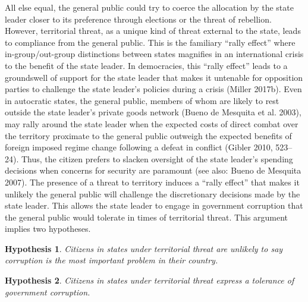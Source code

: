 \documentclass[11pt,]{article}
\newtheorem{hypothesis}{Hypothesis}
\begin{document}
All else equal, the general public could try to coerce the allocation by
the state leader closer to its preference through elections or the
threat of rebellion. However, territorial threat, as a unique kind of
threat external to the state, leads to compliance from the general
public. This is the familiary ``rally effect'' where in-group/out-group
distinctions between states magnifies in an international crisis to the
benefit of the state leader. In democracies, this ``rally effect'' leads
to a groundswell of support for the state leader that makes it untenable
for opposition parties to challenge the state leader's policies during a
crisis (Miller 2017b). Even in autocratic states, the general public,
members of whom are likely to rest outside the state leader's private
goods network (Bueno de Mesquita et al. 2003), may rally around the
state leader when the expected costs of direct combat over the territory
proximate to the general public outweigh the expected benefits of
foreign imposed regime change following a defeat in conflict (Gibler
2010, 523--24). Thus, the citizen prefers to slacken oversight of the
state leader's spending decisions when concerns for security are
paramount (see also: Bueno de Mesquita 2007). The presence of a threat
to territory induces a ``rally effect'' that makes it unlikely the
general public will challenge the discretionary decisions made by the
state leader. This allows the state leader to engage in government
corruption that the general public would tolerate in times of
territorial threat. This argument implies two hypotheses.

\begin{hypothesis}
\begin{minipage}[t]{5.1 in}
Citizens in states under territorial threat are unlikely to say corruption is the most important problem in their country.
\end{minipage}
\end{hypothesis}

\begin{hypothesis}
\begin{minipage}[t]{5.1 in}
Citizens in states under territorial threat express a tolerance of government corruption.
\end{minipage}
\end{hypothesis}
\end{document}
